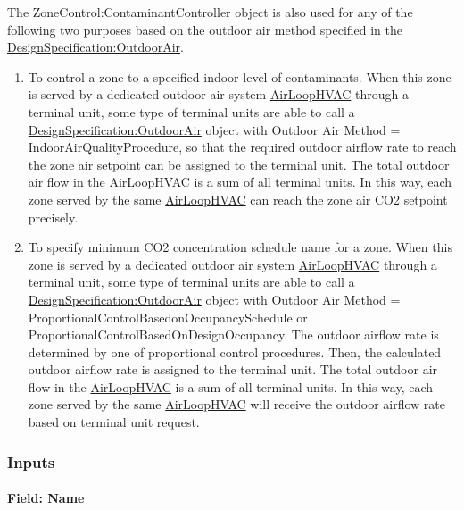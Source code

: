 The ZoneControl:ContaminantController object is also used for any of the following two purposes based on the outdoor air method specified in the \hyperref[designspecificationoutdoorair]{DesignSpecification:OutdoorAir}.

\begin{enumerate}
\def\labelenumi{\arabic{enumi})}
\item
  To control a zone to a specified indoor level of contaminants. When this zone is served by a dedicated outdoor air system \hyperref[airloophvac]{AirLoopHVAC} through a terminal unit, some type of terminal units are able to call a \hyperref[designspecificationoutdoorair]{DesignSpecification:OutdoorAir} object with Outdoor Air Method = IndoorAirQualityProcedure, so that the required outdoor airflow rate to reach the zone air setpoint can be assigned to the terminal unit. The total outdoor air flow in the \hyperref[airloophvac]{AirLoopHVAC} is a sum of all terminal units. In this way, each zone served by the same \hyperref[airloophvac]{AirLoopHVAC} can reach the zone air CO2 setpoint precisely.
\item
  To specify minimum CO2 concentration schedule name for a zone. When this zone is served by a dedicated outdoor air system \hyperref[airloophvac]{AirLoopHVAC} through a terminal unit, some type of terminal units are able to call a \hyperref[designspecificationoutdoorair]{DesignSpecification:OutdoorAir} object with Outdoor Air Method = ProportionalControlBasedonOccupancySchedule or ProportionalControlBasedOnDesignOccupancy. The outdoor airflow rate is determined by one of proportional control procedures. Then, the calculated outdoor airflow rate is assigned to the terminal unit. The total outdoor air flow in the \hyperref[airloophvac]{AirLoopHVAC} is a sum of all terminal units. In this way, each zone served by the same \hyperref[airloophvac]{AirLoopHVAC} will receive the outdoor airflow rate based on terminal unit request.

\end{enumerate}

\subsubsection{Inputs}\label{inputs-14-017}

\paragraph{Field: Name}\label{field-name-12-013}

